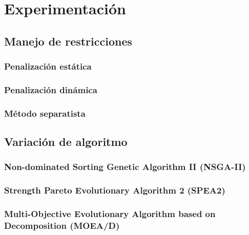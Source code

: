 \chapter{Experimentación}
\label{ch:experimentacion}

\section{Manejo de restricciones}
\label{ch:manejo-restricciones}

\subsection{Penalización estática}
\label{ch:penalizacion-estatica}

\subsection{Penalización dinámica}
\label{ch:penalizacion-dinamica}

\subsection{Método separatista}
\label{ch:metodo-separatista}


\section{Variación de algoritmo}
\label{ch:distinto-algoritmo}

\subsection{Non-dominated Sorting Genetic Algorithm II (NSGA-II)}
\label{ch:nsga2}

\subsection{Strength Pareto Evolutionary Algorithm 2 (SPEA2)}
\label{ch:spea2}

\subsection{Multi-Objective Evolutionary Algorithm based on Decomposition (MOEA/D)}
\label{ch:moead}
